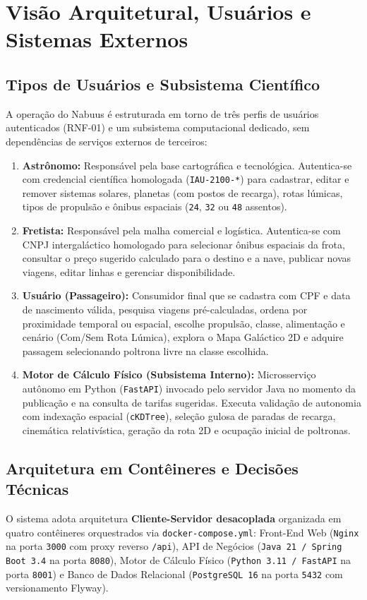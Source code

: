 \documentclass[12pt, a4paper]{article}
\begin{document}
\section{Visão Arquitetural, Usuários e Sistemas Externos}

\subsection{Tipos de Usuários e Subsistema Científico}
A operação do Nabuus é estruturada em torno de três perfis de usuários autenticados (RNF-01) e um subsistema computacional dedicado, sem dependências de serviços externos de terceiros:
\begin{enumerate}
    \item \textbf{Astrônomo:} Responsável pela base cartográfica e tecnológica. Autentica-se com credencial científica homologada (\texttt{IAU-2100-*}) para cadastrar, editar e remover sistemas solares, planetas (com postos de recarga), rotas lúmicas, tipos de propulsão e ônibus espaciais (\texttt{24}, \texttt{32} ou \texttt{48} assentos).
    \item \textbf{Fretista:} Responsável pela malha comercial e logística. Autentica-se com CNPJ intergaláctico homologado para selecionar ônibus espaciais da frota, consultar o preço sugerido calculado para o destino e a nave, publicar novas viagens, editar linhas e gerenciar disponibilidade.
    \item \textbf{Usuário (Passageiro):} Consumidor final que se cadastra com CPF e data de nascimento válida, pesquisa viagens pré-calculadas, ordena por proximidade temporal ou espacial, escolhe propulsão, classe, alimentação e cenário (Com/Sem Rota Lúmica), explora o Mapa Galáctico 2D e adquire passagem selecionando poltrona livre na classe escolhida.
    \item \textbf{Motor de Cálculo Físico (Subsistema Interno):} Microsserviço autônomo em Python (\texttt{FastAPI}) invocado pelo servidor Java no momento da publicação e na consulta de tarifas sugeridas. Executa validação de autonomia com indexação espacial (\texttt{cKDTree}), seleção gulosa de paradas de recarga, cinemática relativística, geração da rota 2D e ocupação inicial de poltronas.
\end{enumerate}

\subsection{Arquitetura em Contêineres e Decisões Técnicas}
O sistema adota arquitetura \textbf{Cliente-Servidor desacoplada} organizada em quatro contêineres orquestrados via \texttt{docker-compose.yml}: Front-End Web (\texttt{Nginx} na porta \texttt{3000} com proxy reverso \texttt{/api}), API de Negócios (\texttt{Java 21 / Spring Boot 3.4} na porta \texttt{8080}), Motor de Cálculo Físico (\texttt{Python 3.11 / FastAPI} na porta \texttt{8001}) e Banco de Dados Relacional (\texttt{PostgreSQL 16} na porta \texttt{5432} com versionamento Flyway).
\end{document}
